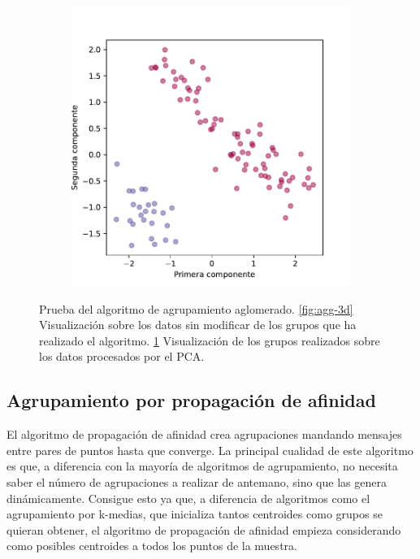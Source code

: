 \begin{figure}[h]
\begin{subfigure}{0.45\textwidth}
    \includegraphics[width=\textwidth]{figures/aglomerative-pca.pdf}
    \caption{}
    \label{fig:agg-pca}
  \end{subfigure}
  \caption[Prueba del algoritmo de agrupamiento aglomerado.]{Prueba del algoritmo de agrupamiento aglomerado. \ref{fig:agg-3d} Visualización sobre los datos sin modificar de los grupos que ha realizado el algoritmo. \ref{fig:agg-pca} Visualización de los grupos realizados sobre los datos procesados por el PCA.}
  \label{fig:agglomerative}
\end{figure}

\newpage
\subsection{Agrupamiento por propagación de afinidad}

El algoritmo de propagación de afinidad \cite{affinity} crea agrupaciones mandando mensajes entre pares de puntos hasta que converge. La principal cualidad de este algoritmo es que, a diferencia con la mayoría de algoritmos de agrupamiento, no necesita saber el número de agrupaciones a realizar de antemano, sino que las genera dinámicamente. Consigue esto ya que, a diferencia de algoritmos como el agrupamiento por k-medias, que inicializa tantos centroides como grupos se quieran obtener, el algoritmo de propagación de afinidad empieza considerando como posibles centroides a todos los puntos de la muestra.

